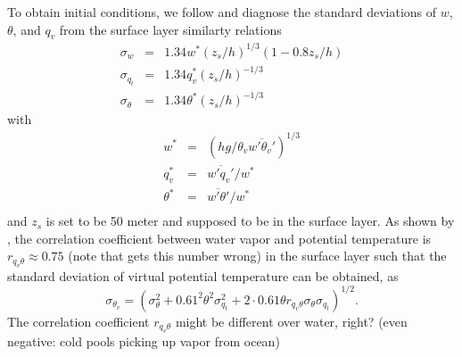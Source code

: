 \documentclass[dvipdfmx,a4paper,10pt]{article}
\begin{document}
% 
% 
% 

To obtain initial conditions, we follow \cite{lenschow80} and diagnose the standard deviations of $w$, $\theta$, and $q_v$ from the surface layer similarty relations
\begin{eqnarray}
 \sigma_w&=&1.34 w^*(z_s/h)^{1/3} (1-0.8z_s/h)\\
   \sigma_{q_t}&=&1.34 q_v^* (z_s/h)^{-1/3}\\\label{eqn:sigmaq}
  \sigma_{\theta}&=&1.34\theta^* (z_s/h)^{-1/3}\label{eqn:sigmath}
\end{eqnarray}
with 
\begin{eqnarray}
  w^*&=&(hg/\theta_v \overline{w'\theta_v'})^{1/3}\\
  q_v^*&=&\overline{w'q_v'}/w^*\\
  \theta^*&=&\overline{w'\theta'}/w^*\\
\end{eqnarray}
and $z_s$ is set to be 50 meter and supposed to be in the surface layer. As shown by \cite[][see their Fig.~12]{sorbjan91}, the correlation coefficient between water vapor and potential temperature is $r_{q_v\theta}\approx 0.75$ {\color{blue}(note that \cite{cheinet03a} gets this number wrong)} in the surface layer such that the standard deviation of virtual potential temperature can be obtained, as  
\begin{equation}\label{eqn:sigmathv}
 \sigma_{\theta_v}= (\sigma_{\theta}^2 + 0.61^2 \theta^2\sigma_{q_t}^2+2\cdot 0.61\theta r_{q_v\theta} \sigma_{\theta} \sigma_{q_t} )^{1/2}.
\end{equation}
{\color{blue}The correlation coefficient $r_{q_v\theta}$ might be different over water, right? (even negative: cold pools picking up vapor from ocean)}
\end{document}
